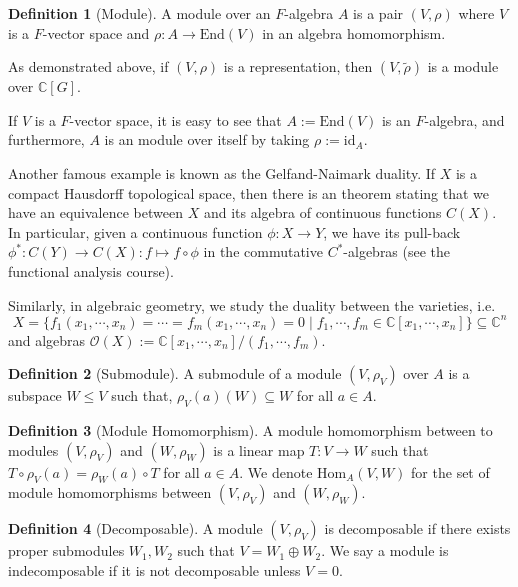 \documentclass[]{article}
\theoremstyle{definition}
\theoremstyle{definition}
\newtheorem{definition}{Definition}[section]
\begin{document}
\begin{definition}[Module]
  A module over an \(F\)-algebra \(A\) is a pair \((V, \rho)\) where 
  \(V\) is a \(F\)-vector space and \(\rho : A \to \text{End}(V)\) in an algebra 
  homomorphism.
\end{definition}

As demonstrated above, if \((V, \rho)\) is a representation, then \((V, \tilde \rho)\) 
is a module over \(\mathbb{C}[G]\).

If \(V\) is a \(F\)-vector space, it is easy to see that \(A := \text{End}(V)\) is 
an \(F\)-algebra, and furthermore, \(A\) is an module over itself by taking 
\(\rho := \text{id}_A\).

Another famous example is known as the Gelfand-Naimark duality. If 
\(X\) is a compact Hausdorff topological space, then there is an theorem stating 
that we have an equivalence between \(X\) and its algebra of continuous 
functions \(C(X)\). In particular, given a continuous function \(\phi : X \to Y\), we 
have its pull-back \(\phi^* : C(Y) \to C(X) : f \mapsto f \circ \phi\) in 
the commutative \(C^*\)-algebras (see the functional analysis course).

Similarly, in algebraic geometry, we study the duality between the varieties, 
i.e. 
\[X = \{f_1(x_1, \cdots, x_n) = \cdots = f_m(x_1, \cdots, x_n) = 0 \mid 
  f_1, \cdots, f_m \in \mathbb{C}[x_1, \cdots, x_n]\} 
  \subseteq \mathbb{C}^n\]
and algebras \(\mathcal{O}(X) := \mathbb{C}[x_1, \cdots, x_n] / (f_1, \cdots, f_m)\).

\begin{definition}[Submodule]
  A submodule of a module \((V, \rho_V)\) over \(A\) is a subspace \(W \le V\) such 
  that, \(\rho_V(a)(W) \subseteq W\) for all \(a \in A\).
\end{definition}

\begin{definition}[Module Homomorphism]
  A module homomorphism between to modules \((V, \rho_V)\) and \((W, \rho_W)\) is 
  a linear map \(T : V \to W\) such that \(T \circ \rho_V(a) = \rho_W(a) \circ T\) 
  for all \(a \in A\). We denote \(\text{Hom}_A(V, W)\) for the set of 
  module homomorphisms between \((V, \rho_V)\) and \((W, \rho_W)\).
\end{definition}

\begin{definition}[Decomposable]
  A module \((V, \rho_V)\) is decomposable if there exists proper submodules 
  \(W_1, W_2\) such that \(V = W_1 \oplus W_2\). We say a module is indecomposable 
  if it is not decomposable unless \(V = 0\). 
\end{definition}
\end{document}
